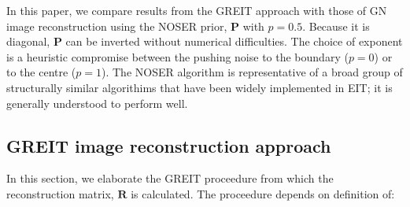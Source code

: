 \documentclass[12pt]{iopart}
\newcommand{\RB}{\mbox{$\mathbf{R}$}}
\renewcommand{\PB}{\mbox{$\mathbf{P}$}}
\begin{document}
In this paper, we compare results from the GREIT approach
with those of GN image reconstruction using the NOSER prior,
$\PB$ with $p=0.5$.
Because it is diagonal, $\PB$ can be
inverted without numerical difficulties. The choice of exponent is
a heuristic compromise between the pushing noise to the boundary
($p=0$) or to the centre ($p=1$). The NOSER algorithm is 
representative of a broad group of structurally similar 
algorithims that have been widely implemented in EIT;
it is generally understood to perform well.


\subsection{GREIT image reconstruction approach}

In this section, we elaborate the GREIT proceedure
from which the reconstruction matrix, $\RB$ is
calculated.  The proceedure depends on definition
of:
\end{document}
